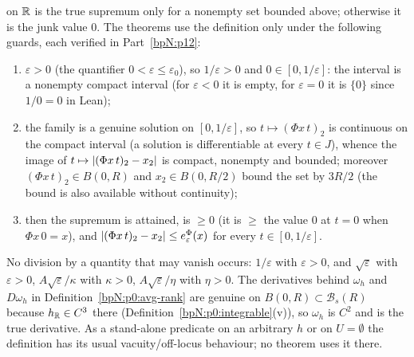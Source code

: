 \begin{remark}\label{bpN:p0:avg-totality}
 on $\mathbb{R}$ is the true supremum only for a nonempty set bounded above; otherwise it is the junk value $0$. The theorems use the definition
only under the following guards, each verified in Part~\ref{bpN:p12}:
\begin{enumerate}[label=(\alph*)]
\item $\varepsilon>0$ (the quantifier $0<\varepsilon\le\varepsilon_0$), so $1/\varepsilon>0$ and $0\in[0,1/\varepsilon]$: the interval is a nonempty compact interval (for $\varepsilon<0$ it is empty, for $\varepsilon=0$ it is $\{0\}$ since $1/0=0$ in Lean);
\item the family is a genuine solution on $[0,1/\varepsilon]$, so $t\mapsto(\Phi x\,t)_2$ is continuous on the compact interval (a solution is differentiable at every $t\in J$), whence the image of $t\mapsto\lvert (\Phi x\,t)_2-x_2\rvert$ is compact, nonempty and bounded; moreover $(\Phi x\,t)_2\in B(0,R)$ and $x_2\in B(0,R/2)$ bound the set by $3R/2$ (the bound is also available without continuity);
\item then the supremum is attained, is $\ge0$ (it is $\ge$ the value $0$ at $t=0$ when $\Phi x\,0=x$), and $\lvert (\Phi x\,t)_2-x_2\rvert\le e^\Phi_\varepsilon(x)$ for every $t\in[0,1/\varepsilon]$.
\end{enumerate}
No division by a quantity that may vanish occurs: $1/\varepsilon$ with $\varepsilon>0$, and $\sqrt\varepsilon$ with $\varepsilon>0$, $A\sqrt\varepsilon/\kappa$ with $\kappa>0$, $A\sqrt\varepsilon/\eta$ with $\eta>0$. The derivatives behind $\omega_h$ and $D\omega_h$ in
Definition~\ref{bpN:p0:avg-rank} are genuine on $B(0,R)\subset\mathcal B_s(R)$ because $h_{\mathbb{R}}\in C^3$ there (Definition~\ref{bpN:p0:integrable}(v)), so $\omega_h$ is $C^2$ and  is the true derivative. As a stand-alone predicate on an arbitrary $h$ or on $U=\emptyset$ the definition has its usual vacuity/off-locus behaviour; no theorem uses it there.
\end{remark}

